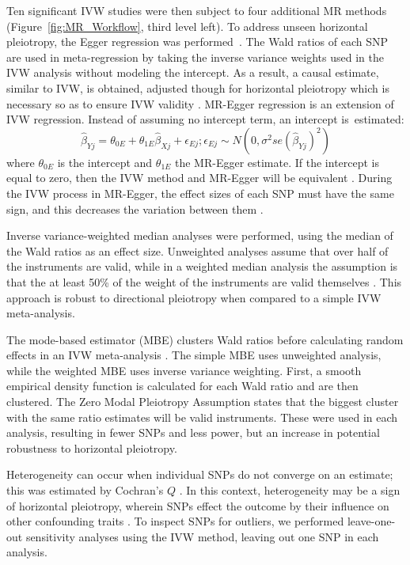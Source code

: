 \documentclass[genes,article,accept,moreauthors,pdftex]{Definitions/mdpi}
\begin{document}
Ten significant IVW studies were then subject to four additional MR methods (\mbox{Figure~\ref{fig:MR_Workflow}}, third level left).  To address unseen horizontal pleiotropy, the Egger regression was performed~\cite{bowden_framework_2017,bowden_mendelian_2015}. The Wald ratios of each SNP are used in meta-regression by taking the inverse variance weights used in the IVW analysis without modeling the intercept. As a result, a causal estimate, similar to IVW, is obtained, adjusted though for horizontal pleiotropy which is necessary so as to ensure IVW validity \cite{bowden_mendelian_2015}.
MR-Egger regression is an extension of IVW regression. Instead of assuming no intercept term, an intercept is~estimated:
\begin{equation}
\widehat{\beta}_{Yj} = \theta_{0E} + \theta_{1E}\widehat{\beta}_{Xj} + \epsilon_{Ej}; \epsilon_{Ej} \sim N(0,\sigma^2se(\widehat{\beta}_{Yj})^2)
\end{equation}
where $\theta_{0E}$ is the intercept and $\theta_{1E}$ the MR-Egger estimate.
If the intercept is equal to zero, then the IVW method and MR-Egger will be equivalent \cite{burgess_interpreting_2017}. During the IVW process in MR-Egger, the effect sizes of each SNP must have the same sign, and this decreases the variation between them \cite{bowden_mendelian_2015}.

Inverse variance-weighted median analyses were performed, using the median of the Wald ratios as an effect size. Unweighted analyses assume that over half of the instruments are valid, while in a weighted median analysis the assumption is that the at least 50\% of the weight of the instruments are valid themselves \cite{bowden_consistent_2016}. This approach is robust to directional pleiotropy when compared to a simple IVW meta-analysis.

The mode-based estimator (MBE) clusters Wald ratios before calculating random effects in an IVW meta-analysis \cite{hartwig_robust_2017}. The simple MBE uses unweighted analysis, while the weighted MBE uses inverse variance weighting. First, a smooth empirical density function is calculated for each Wald ratio and are then clustered. The Zero Modal Pleiotropy Assumption states that the biggest cluster with the same ratio estimates will be valid instruments. These were used in each analysis, resulting in fewer SNPs and less power, but an increase in potential robustness to horizontal pleiotropy.

Heterogeneity can occur when individual SNPs do not converge on an estimate; this was estimated by Cochran's $Q$ \cite{higgins_cochrane_2011}. In this context, heterogeneity may be a sign of horizontal pleiotropy, wherein SNPs effect the outcome by their influence on other confounding traits \cite{burgess_review_2017}. To inspect SNPs for outliers, we performed leave-one-out sensitivity analyses using the IVW method, leaving out one SNP in each analysis. 
\end{document}
